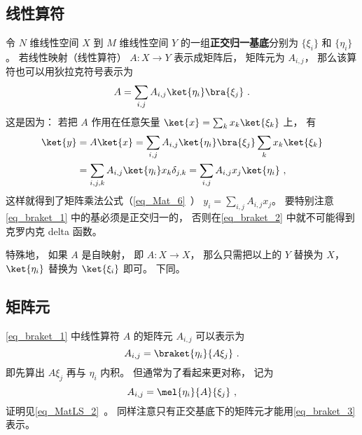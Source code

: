 \subsection{线性算符}
令 $N$ 维线性空间 $X$ 到 $M$ 维线性空间 $Y$ 的一组\textbf{正交归一基底}分别为 $\{\xi_i\}$ 和 $\{\eta_i\}$。 若线性映射（线性算符） $A:X\to Y$ 表示成矩阵后， 矩阵元为 $A_{i,j}$， 那么该算符也可以用狄拉克符号表示为
\begin{equation}\label{eq_braket_1}
A = \sum_{i,j} A_{i,j} \ket{\eta_i}\bra{\xi_j}~.
\end{equation}
这是因为： 若把 $A$ 作用在任意矢量 $\ket{x} = \sum_k x_k\ket{\xi_k}$ 上， 有
\begin{equation}\label{eq_braket_2}
\begin{aligned}
\ket{y} &= A\ket{x} = \sum_{i,j} A_{i,j} \ket{\eta_i}\bra{\xi_j} \sum_k x_k\ket{\xi_k}\\
&= \sum_{i,j, k} A_{i,j} \ket{\eta_i} x_k \delta_{j,k}
= \sum_{i,j} A_{i,j} x_j \ket{\eta_i}~,
\end{aligned}
\end{equation}
这样就得到了矩阵乘法公式（\autoref{eq_Mat_6}~） $y_i = \sum_{i,j} A_{i,j} x_j$。 要特别注意\autoref{eq_braket_1} 中的基必须是正交归一的， 否则在\autoref{eq_braket_2} 中就不可能得到克罗内克 delta 函数。

特殊地， 如果 $A$ 是自映射， 即 $A:X\to X$， 那么只需把以上的 $Y$ 替换为 $X$， $\ket{\eta_i}$ 替换为 $\ket{\xi_i}$ 即可。 下同。

\subsection{矩阵元}
\autoref{eq_braket_1} 中线性算符 $A$ 的矩阵元 $A_{i,j}$ 可以表示为
\begin{equation}
A_{i,j} = \braket{\eta_i}{A\xi_j}~.
\end{equation}
即先算出 $A\xi_j$ 再与 $\eta_i$ 内积。 但通常为了看起来更对称， 记为
\begin{equation}\label{eq_braket_3}
A_{i,j} = \mel{\eta_i}{A}{\xi_j}~,
\end{equation}
证明见\autoref{eq_MatLS_2}~。 同样注意只有正交基底下的矩阵元才能用\autoref{eq_braket_3} 表示。
